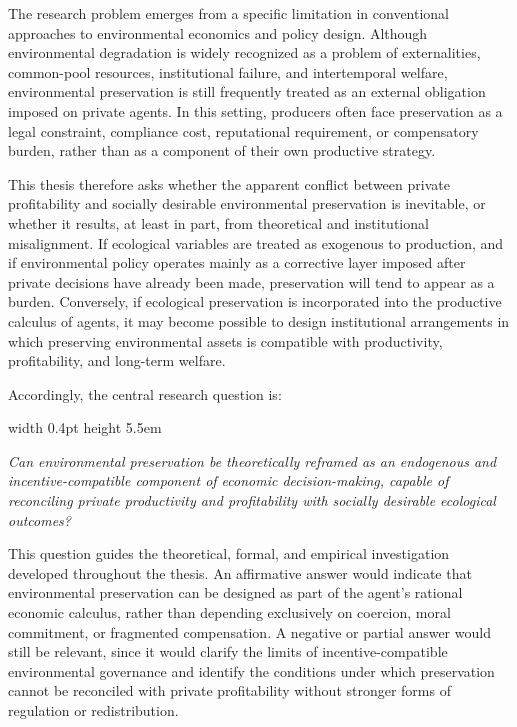 The research problem emerges from a specific limitation in conventional approaches to environmental economics and policy design. Although environmental degradation is widely recognized as a problem of externalities, common-pool resources, institutional failure, and intertemporal welfare, environmental preservation is still frequently treated as an external obligation imposed on private agents. In this setting, producers often face preservation as a legal constraint, compliance cost, reputational requirement, or compensatory burden, rather than as a component of their own productive strategy.

This thesis therefore asks whether the apparent conflict between private profitability and socially desirable environmental preservation is inevitable, or whether it results, at least in part, from theoretical and institutional misalignment. If ecological variables are treated as exogenous to production, and if environmental policy operates mainly as a corrective layer imposed after private decisions have already been made, preservation will tend to appear as a burden. Conversely, if ecological preservation is incorporated into the productive calculus of agents, it may become possible to design institutional arrangements in which preserving environmental assets is compatible with productivity, profitability, and long-term welfare.

Accordingly, the central research question is:

\vspace{1em}

\begin{flushright}
\begin{minipage}{0.93\linewidth}
\noindent
\hspace{0.4em}\vrule width 0.4pt height 5.5em \hspace{1.2em}%
\parbox[b]{0.95\linewidth}{
\textit{Can environmental preservation be theoretically reframed as an endogenous and incentive-compatible component of economic decision-making, capable of reconciling private productivity and profitability with socially desirable ecological outcomes?}
}
\end{minipage}
\end{flushright}

\vspace{1em}

This question guides the theoretical, formal, and empirical investigation developed throughout the thesis. An affirmative answer would indicate that environmental preservation can be designed as part of the agent's rational economic calculus, rather than depending exclusively on coercion, moral commitment, or fragmented compensation. A negative or partial answer would still be relevant, since it would clarify the limits of incentive-compatible environmental governance and identify the conditions under which preservation cannot be reconciled with private profitability without stronger forms of regulation or redistribution.

